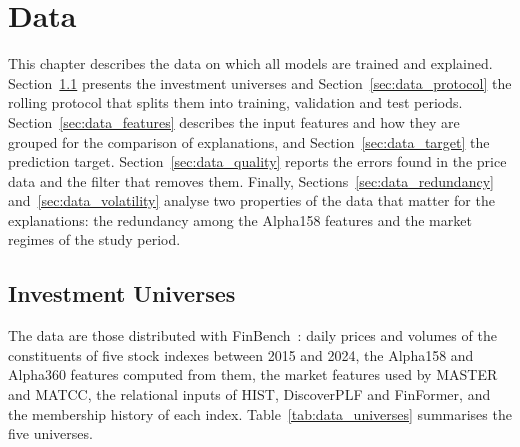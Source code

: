 
\chapter{Data}
\label{ch:data}

This chapter describes the data on which all models are trained and explained. Section~\ref{sec:data_universes} presents the investment universes and Section~\ref{sec:data_protocol} the rolling protocol that splits them into training, validation and test periods. Section~\ref{sec:data_features} describes the input features and how they are grouped for the comparison of explanations, and Section~\ref{sec:data_target} the prediction target. Section~\ref{sec:data_quality} reports the errors found in the price data and the filter that removes them. Finally, Sections~\ref{sec:data_redundancy} and~\ref{sec:data_volatility} analyse two properties of the data that matter for the explanations: the redundancy among the Alpha158 features and the market regimes of the study period.

\section{Investment Universes}
\label{sec:data_universes}

The data are those distributed with FinBench~\cite{pederzoli2026finbench}: daily prices and volumes of the constituents of five stock indexes between 2015 and 2024, the Alpha158 and Alpha360 features computed from them, the market features used by MASTER and MATCC, the relational inputs of HIST, DiscoverPLF and FinFormer, and the membership history of each index. Table~\ref{tab:data_universes} summarises the five universes.

